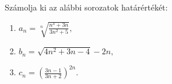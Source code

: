 \documentclass[11pt]{scrartcl}
\begin{document}
Számolja ki az alábbi sorozatok határértékét:
\begin{enumerate}
	\item \(\displaystyle
	      a_n = \sqrt[n]{\frac{n^3 + 3n}{3n^2 + 5}},
	      \)

	\item \(\displaystyle
	      b_n = \sqrt{4n^2 + 3n - 4} - 2n,
	      \)

	\item \(\displaystyle
	      c_n = \left(
	      \frac{3n - 1}{3n + 2}
	      \right)^{2n}.
	      \)
\end{enumerate}
\end{document}
